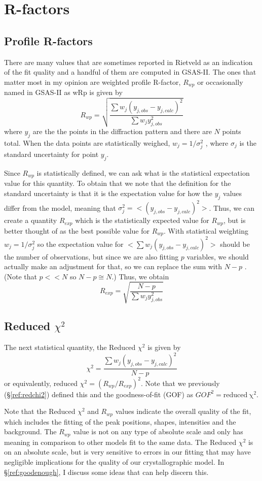 \chapter{R-factors}\label{Chap:rfactors}

\section{Profile R-factors}
There are many values that are sometimes reported in Rietveld as an indication of the fit quality and a handful of them are computed in GSAS-II. The ones that matter most in my opinion are weighted profile R-factor, $R_{wp}$ or occasionally named in GSAS-II as wRp is given by 
$$R_{wp} = \sqrt{ \frac{\sum w_j(y_{j,obs}-y_{j,calc})^2}{\sum w_jy_{j,obs}^2} }$$
where $y_j$ are the the points in the diffraction pattern and there are $N$ points total. When the data points are statistically weighed, $w_j = 1/\sigma_j^2$ , where $\sigma_j$ is the standard uncertainty for point $y_j$. 

Since $R_{wp}$ is statistically defined, we can ask what is the statistical expectation value for this quantity. To obtain that we note that the definition for the standard uncertainty is that it is the expectation value for how the $y_j$ values differ from the model, meaning that $\sigma_j^2 = <(y_{j,obs}-y_{j,calc})^2>$. Thus, we can create a quantity $R_{exp}$  which is the statistically expected value for $R_{wp}$, but is better thought of as the best possible value for $R_{wp}$. With statistical weighting $w_j = 1/\sigma_j^2$  so the expectation value for $<\sum w_j(y_{j,obs}-y_{j,calc})^2>$ should be the number of observations, but since we are also fitting $p$ variables, we should actually make an adjustment for that, so we can replace the sum with $N-p$ . (Note that $p << N$ so $N-p \cong N$.) Thus, we obtain 
$$R_{exp} = \sqrt{ \frac{N-p}{\sum w_jy_{j,obs}^2} }$$
\section{Reduced \texorpdfstring{$\chi^2$}{Chi-squared}}
The next statistical quantity, the Reduced $\chi^2$  is given by 
$$\chi^2  =  \frac{\sum w_j(y_{j,obs}-y_{j,calc})^2}{N-p} $$
or equivalently,  reduced $\chi^2  = (R_{wp}/R_{exp})^2$. Note that we previously (\S\ref{ref:redchi2}) defined this and the goodness-of-fit (GOF) as $GOF^2 = \mathrm{reduced\ \chi^2}$.

Note that the Reduced $\chi^2$ and $R_{wp}$ values indicate the overall quality of the fit, which includes the fitting of the peak positions, shapes, intensities and the background. The  $R_{wp}$ value is not on any type of absolute scale and only has meaning in comparison to other models fit to the same data. The Reduced $\chi^2$ is on an absolute scale, but is very sensitive to errors in our fitting that may have negligible implications for the quality of our crystallographic model. In \S\ref{ref:goodenough}, I discuss some ideas that can help discern this. 


